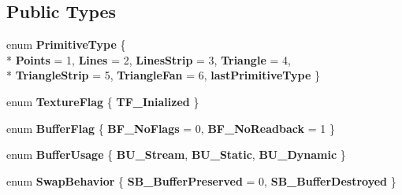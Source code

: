 \subsection*{Public Types}
\begin{DoxyCompactItemize}
\item 
\hypertarget{class_tempest_1_1_abstract_a_p_i_aef6ae893cb6a74e488237d01bf87e1b3}{enum {\bfseries Primitive\+Type} \{ \\*
{\bfseries Points} = 1, 
{\bfseries Lines} = 2, 
{\bfseries Lines\+Strip} = 3, 
{\bfseries Triangle} = 4, 
\\*
{\bfseries Triangle\+Strip} = 5, 
{\bfseries Triangle\+Fan} = 6, 
{\bfseries last\+Primitive\+Type}
 \}}\label{class_tempest_1_1_abstract_a_p_i_aef6ae893cb6a74e488237d01bf87e1b3}

\item 
\hypertarget{class_tempest_1_1_abstract_a_p_i_ad8fd92988d12f1d30d4e86e2bf2c79be}{enum {\bfseries Texture\+Flag} \{ {\bfseries T\+F\+\_\+\+Inialized}
 \}}\label{class_tempest_1_1_abstract_a_p_i_ad8fd92988d12f1d30d4e86e2bf2c79be}

\item 
\hypertarget{class_tempest_1_1_abstract_a_p_i_aab56c4529c001035167fd491b8ecf78e}{enum {\bfseries Buffer\+Flag} \{ {\bfseries B\+F\+\_\+\+No\+Flags} = 0, 
{\bfseries B\+F\+\_\+\+No\+Readback} = 1
 \}}\label{class_tempest_1_1_abstract_a_p_i_aab56c4529c001035167fd491b8ecf78e}

\item 
\hypertarget{class_tempest_1_1_abstract_a_p_i_a7e6dc64a080b456af6599e71168d5797}{enum {\bfseries Buffer\+Usage} \{ {\bfseries B\+U\+\_\+\+Stream}, 
{\bfseries B\+U\+\_\+\+Static}, 
{\bfseries B\+U\+\_\+\+Dynamic}
 \}}\label{class_tempest_1_1_abstract_a_p_i_a7e6dc64a080b456af6599e71168d5797}

\item 
\hypertarget{class_tempest_1_1_abstract_a_p_i_a06f9ac3e2e0a44d7f68eb6256da854cd}{enum {\bfseries Swap\+Behavior} \{ {\bfseries S\+B\+\_\+\+Buffer\+Preserved} = 0, 
{\bfseries S\+B\+\_\+\+Buffer\+Destroyed}
 \}}\label{class_tempest_1_1_abstract_a_p_i_a06f9ac3e2e0a44d7f68eb6256da854cd}

\end{DoxyCompactItemize}
